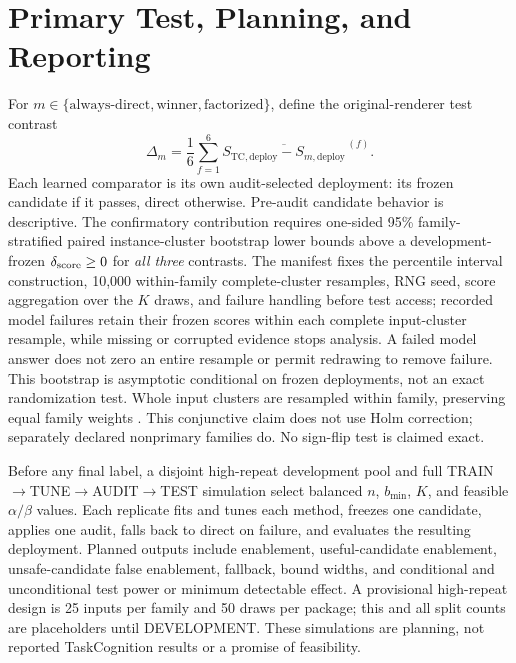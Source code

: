 \documentclass{article}
\newcommand{\1}{\mathbb{I}}
\begin{document}
\section{Primary Test, Planning, and Reporting}
For $m\in\{\text{always-direct},\text{winner},\text{factorized}\}$, define the original-renderer test contrast
\begin{equation}
 \Delta_m=\frac16\sum_{f=1}^6
 \overline{S_{\mathrm{TC,deploy}}-S_{m,\mathrm{deploy}}}^{\,(f)}.
 \label{eq:primary}
\end{equation}
Each learned comparator is its own audit-selected deployment: its frozen candidate if it passes, direct otherwise. Pre-audit candidate behavior is descriptive. The confirmatory contribution requires one-sided 95\% family-stratified paired instance-cluster bootstrap lower bounds above a development-frozen $\delta_{\rm score}\geq0$ for \emph{all three} contrasts. The manifest fixes the percentile interval construction, 10,000 within-family complete-cluster resamples, RNG seed, score aggregation over the $K$ draws, and failure handling before test access; recorded model failures retain their frozen scores within each complete input-cluster resample, while missing or corrupted evidence stops analysis. A failed model answer does not zero an entire resample or permit redrawing to remove failure. This bootstrap is asymptotic conditional on frozen deployments, not an exact randomization test. Whole input clusters are resampled within family, preserving equal family weights \citep{field2007bootstrapping}. This conjunctive claim does not use Holm correction; separately declared nonprimary families do. No sign-flip test is claimed exact.

Before any final label, a disjoint high-repeat development pool and full TRAIN$\rightarrow$TUNE$\rightarrow$AUDIT$\rightarrow$TEST simulation select balanced $n$, $b_{\min}$, $K$, and feasible $\alpha/\beta$ values. Each replicate fits and tunes each method, freezes one candidate, applies one audit, falls back to direct on failure, and evaluates the resulting deployment. Planned outputs include enablement, useful-candidate enablement, unsafe-candidate false enablement, fallback, bound widths, and conditional and unconditional test power or minimum detectable effect. A provisional high-repeat design is 25 inputs per family and 50 draws per package; this and all split counts are placeholders until DEVELOPMENT. These simulations are planning, not reported TaskCognition results or a promise of feasibility.
\end{document}
